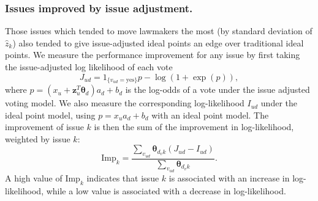 \subsubsection{Issues improved by issue adjustment.}
Those issues which tended to move lawmakers the most (by standard
deviation of $\hat z_k$) also tended to give issue-adjusted ideal
points an edge over traditional ideal points.  We measure the
performance improvement for any issue by first taking the
issue-adjusted log likelihood of each vote
\begin{equation}
  J_{ud} = 1_{\{v_{ud} = \mbox{yes}\}} p - \log(1 + \exp(p)),
\end{equation}
where $p = (x_u + \bm z_{u}^T \bm \theta_d ) a_d + b_d$ is the
log-odds of a vote under the issue adjusted voting model.  We also
measure the corresponding log-likelihood $I_{ud}$ under the ideal
point model, using $p=x_u a_d + b_d$ with an ideal point model. The
improvement of issue $k$ is then the sum of the improvement in
log-likelihood, weighted by issue $k$:
\begin{equation}
  \label{eq:likelihood_improvement}
  \mbox{Imp}_k = \frac{\sum_{v_{ud}} \bm \theta_{d_v k} (J_{ud} - I_{ud}) }
       { \sum_{v_{ud}} \bm \theta_{d_v k} }.
\end{equation}
A high value of $\mbox{Imp}_k$ indicates that issue $k$ is associated
with an increase in log-likelihood, while a low value is associated
with a decrease in log-likelihood.

